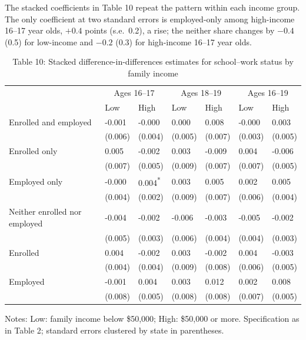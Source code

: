 \documentclass[12pt]{article}
\begin{document}
The stacked coefficients in Table 10 repeat the pattern within each income group. The only coefficient at two standard errors is employed-only among high-income 16--17 year olds, $+0.4$ points (s.e.\ 0.2), a rise; the neither share changes by $-0.4$ (0.5) for low-income and $-0.2$ (0.3) for high-income 16--17 year olds.

\begin{table}
\centering
\caption{Table 10: Stacked difference-in-differences estimates for school--work status by family income}

\small
\begin{tabular}{p{}p{}p{}p{}p{}p{}p{}}
\toprule
 & \multicolumn{2}{c}{Ages 16--17} & \multicolumn{2}{c}{Ages 18--19} & \multicolumn{2}{c}{Ages 16--19} \\

 & Low & High & Low & High & Low & High \\
\midrule
Enrolled and employed & -0.001 & -0.000 & 0.000 & 0.008 & -0.000 & 0.003 \\
 & (0.006) & (0.004) & (0.005) & (0.007) & (0.003) & (0.005) \\
Enrolled only & 0.005 & -0.002 & 0.003 & -0.009 & 0.004 & -0.006 \\
 & (0.007) & (0.005) & (0.009) & (0.007) & (0.007) & (0.005) \\
Employed only & -0.000 & 0.004\textsuperscript{*} & 0.003 & 0.005 & 0.002 & 0.005 \\
 & (0.004) & (0.002) & (0.009) & (0.007) & (0.006) & (0.004) \\
Neither enrolled nor employed & -0.004 & -0.002 & -0.006 & -0.003 & -0.005 & -0.002 \\
 & (0.005) & (0.003) & (0.006) & (0.004) & (0.004) & (0.003) \\
Enrolled & 0.004 & -0.002 & 0.003 & -0.002 & 0.004 & -0.003 \\
 & (0.004) & (0.004) & (0.009) & (0.008) & (0.006) & (0.005) \\
Employed & -0.001 & 0.004 & 0.003 & 0.012 & 0.002 & 0.008 \\
 & (0.008) & (0.005) & (0.008) & (0.008) & (0.007) & (0.005) \\
\bottomrule
\end{tabular}



\noindent\small Notes: Low: family income below \$50,000; High: \$50,000 or more. Specification as in Table 2; standard errors clustered by state in parentheses.

\end{table}
\end{document}
